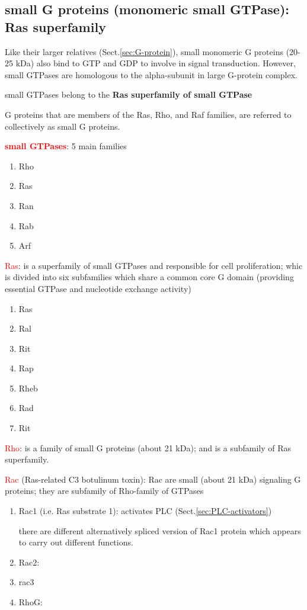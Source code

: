\subsection{small G proteins (monomeric small GTPase): Ras superfamily}
\label{sec:small-G-proteins}
\label{sec:Ras}
\label{sec:Rho}
\label{sec:Raf}
\label{sec:Rac}

Like their larger relatives (Sect.\ref{sec:G-protein}), small monomeric G
proteins (20-25 kDa) also bind to GTP and GDP to involve in signal
transduction. However, small GTPases are homologous to the alpha-subunit in
large G-protein complex.

small GTPases belong to the {\bf Ras superfamily of small GTPase}

G proteins that are members of the Ras, Rho, and Raf families, are referred to collectively as small
G proteins.

\textcolor{red}{\bf small GTPases}: 5 main families
\begin{enumerate}
  \item Rho
  \item Ras
  \item Ran
  \item Rab
  \item Arf
\end{enumerate}

\textcolor{red}{Ras}: is a superfamily of small GTPases and responsible for
cell proliferation; whic is divided into six subfamilies which share a common
core G domain (providing essential GTPase and nucleotide exchange activity)
\begin{enumerate}
  \item Ras
  \item Ral
  \item Rit
  \item Rap
  \item Rheb
  \item Rad
  \item Rit
\end{enumerate}

\textcolor{red}{Rho}: is a family of small G proteins (about 21 kDa); and is a
subfamily of Ras superfamily.

\textcolor{red}{Rac} (Ras-related C3 botulinum toxin): Rac are small
(about 21 kDa) signaling G proteins; they are subfamily of Rho-family of GTPases
\begin{enumerate}
  \item Rac1 (i.e. Ras substrate 1): activates PLC
  (Sect.\ref{sec:PLC-activators})
  
  there are different alternatively spliced version of Rac1 protein which
  appears to carry out different functions.
  
  \item Rac2:
  
  \item rac3
  
  \item RhoG: 
\end{enumerate}

